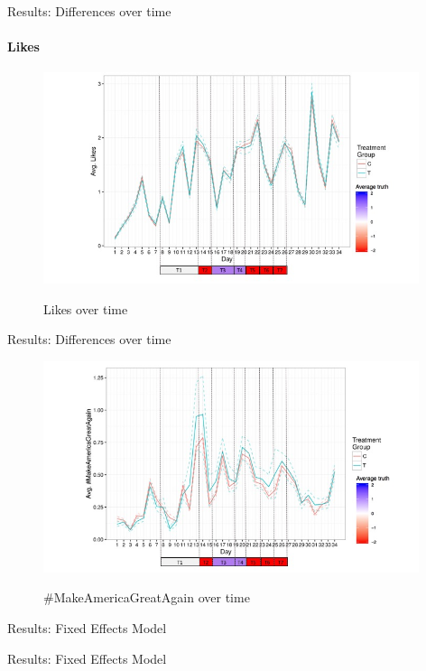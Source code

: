 \documentclass[10pt]{beamer}\usepackage[]{graphicx}\usepackage[]{color}
\begin{document}
\begin{frame}{Results: Differences over time}
\framesubtitle{Likes}

\begin{figure}
\includegraphics[width=11cm]{../plots/likes_tweets.jpg}
\label{fig:likes_time}
\caption{Likes over time}
\end{figure}

\end{frame}

\begin{frame}{Results: Differences over time}

\begin{figure}
\includegraphics[width=11cm]{../plots/maga_tweets.jpg}
\label{fig:maga_time}
\caption{\#MakeAmericaGreatAgain over time}
\end{figure}

\end{frame}



\begin{frame}{Results: Fixed Effects Model}

{\tiny

}


\end{frame}

\begin{frame}{Results: Fixed Effects Model}

{\tiny

}


\end{frame}
\end{document}
